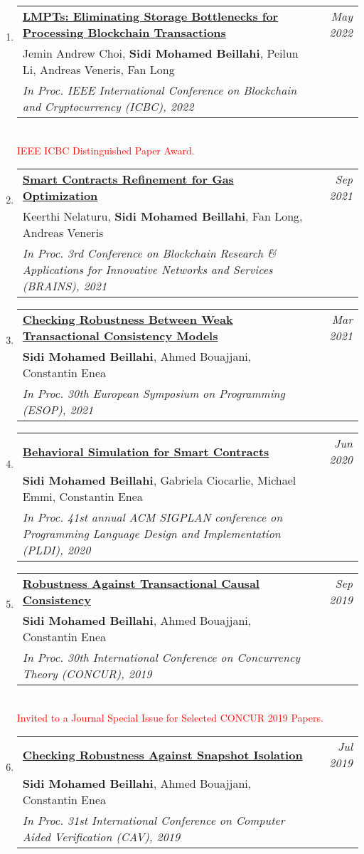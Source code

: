 \documentclass[10pt]{article}
\makeatletter
\newcommand{\lbar}[1]{{\color{#1}\ding{118}}\hspace*{2pt}}
\newenvironment{benumerate}[2]{
    \let\oldItem\item
    \def\item{\addtocounter{enumi}{-2}\oldItem}
    \begin{enumerate}[#2] \itemsep3pt
    \setcounter{enumi}{#1}
    \addtocounter{enumi}{1}}
  {\end{enumerate}}
\newenvironment{publication}[5]
{ \item
  \begin{tabular*}{7.5in}{p{6.3in}@{\extracolsep{\fill}}r}
    \href{#1}{\textbf{#2}} & \textit{#3}\\ #4 &\\ \textit{#5}&\\
  \end{tabular*}
} {}
\newenvironment{region}[3]{%
  \vspace*{0.5ex}
  {\scalebox{1.4}{\textbf{#1}}}
  \begin{benumerate}{#3}{\color{RoyalBlue}#2}}
  {\end{benumerate}\vspace{0.8ex}}
\makeatother
\begin{document}
\begin{region} {\lbar{purple}Conference Publications}{{C}1}{14}
  \begin{publication} {https://beillahi.github.io/papers/2022044041.pdf}
		{LMPTs: Eliminating Storage Bottlenecks for Processing Blockchain Transactions}
		{May 2022} {Jemin Andrew Choi, \textbf{Sidi Mohamed Beillahi}, Peilun Li, Andreas Veneris, Fan Long}
		{In Proc. IEEE International Conference on Blockchain and Cryptocurrency (ICBC), 2022}
    {\\ \textcolor{red}{IEEE ICBC Distinguished Paper Award.}}
  \end{publication}

  \begin{publication} {https://beillahi.github.io/papers/BRAINS21.pdf}
		{Smart Contracts Refinement for Gas Optimization}
		{Sep 2021} {Keerthi Nelaturu, \textbf{Sidi Mohamed Beillahi}, Fan Long, Andreas Veneris}
		{In Proc. 3rd Conference on Blockchain Research \& Applications for Innovative Networks and Services (BRAINS), 2021}
  \end{publication}

  \begin{publication} {https://beillahi.github.io/papers/ESOP21.pdf}
		{Checking Robustness Between Weak Transactional Consistency Models}
		{Mar 2021} {\textbf{Sidi Mohamed Beillahi}, Ahmed Bouajjani, Constantin Enea} 
		{In Proc. 30th European Symposium on Programming (ESOP), 2021} 
  \end{publication}

	\begin{publication} {https://beillahi.github.io/papers/PLDI20.pdf}
		{Behavioral Simulation for Smart Contracts}
		{Jun 2020} {\textbf{Sidi Mohamed Beillahi}, Gabriela Ciocarlie, Michael Emmi, Constantin Enea}
		{In Proc. 41st annual ACM SIGPLAN conference on Programming Language Design and Implementation (PLDI), 2020}
  \end{publication}

	\begin{publication} {https://beillahi.github.io/papers/CONCUR19.pdf}
		{Robustness Against Transactional Causal Consistency}
		{Sep 2019} {\textbf{Sidi Mohamed Beillahi}, Ahmed Bouajjani, Constantin Enea}
    {In Proc. 30th International Conference on Concurrency Theory (CONCUR), 2019}
    {\\ \textcolor{red}{Invited to a Journal Special Issue for Selected CONCUR 2019 Papers.}}
  \end{publication}

  \begin{publication} {https://beillahi.github.io/papers/CAV19.pdf}
    {Checking Robustness Against Snapshot Isolation}
    {Jul 2019} {\textbf{Sidi Mohamed Beillahi}, Ahmed Bouajjani, Constantin Enea}
    {In Proc. 31st International Conference on Computer Aided Verification (CAV), 2019}
  \end{publication}


\end{region}
\end{document}
